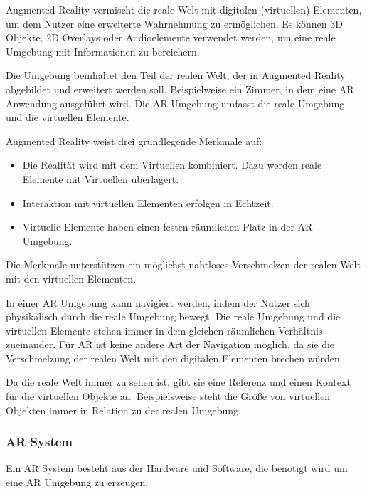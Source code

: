 Augmented Reality vermischt die reale Welt mit digitalen (virtuellen) Elementen, um dem Nutzer eine erweiterte Wahrnehmung zu ermöglichen. Es können 3D Objekte, 2D Overlays oder Audioelemente verwendet werden, um eine reale Umgebung mit Informationen zu bereichern. 

Die Umgebung beinhaltet den Teil der realen Welt, der in Augmented Reality abgebildet und erweitert werden soll. Beispielweise ein Zimmer, in dem eine AR Anwendung ausgeführt wird.
Die AR Umgebung umfasst die reale Umgebung und die virtuellen Elemente.

Augmented Reality weist drei grundlegende Merkmale auf: 
\begin{itemize}
	\item Die Realität wird mit dem Virtuellen kombiniert. Dazu werden reale Elemente mit Virtuellen überlagert.
	\item Interaktion mit virtuellen Elementen erfolgen in Echtzeit.
	\item Virtuelle Elemente haben einen festen räumlichen Platz in der AR Umgebung.
\end{itemize}

Die Merkmale unterstützen ein möglichst nahtloses Verschmelzen der realen Welt mit den virtuellen Elementen.

In einer AR Umgebung kann navigiert werden, indem der Nutzer sich physikalisch durch die reale Umgebung bewegt. Die reale Umgebung und die virtuellen Elemente stehen immer in dem gleichen räumlichen Verhältnis zueinander. Für AR ist keine andere Art der Navigation möglich, da sie die Verschmelzung der realen Welt mit den digitalen Elementen brechen würden.

Da die reale Welt immer zu sehen ist, gibt sie eine Referenz und einen Kontext für die virtuellen Objekte an. 
Beispielsweise steht die Größe von virtuellen Objekten immer in Relation zu der realen Umgebung.\citep{GrundlagenAR}


\subsubsection{AR System}

Ein AR System besteht aus der Hardware und Software, die benötigt wird um eine AR Umgebung zu erzeugen.

